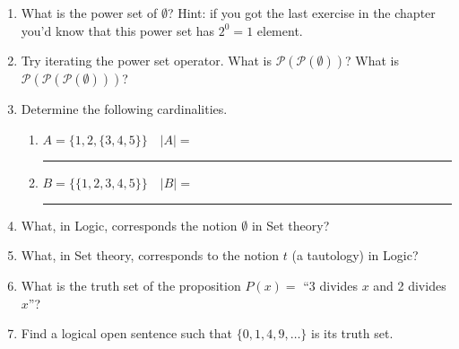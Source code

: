 \begin{enumerate}
\item What is the power set of $\emptyset$?  Hint: if you got the last exercise
in the chapter you'd know that this power set has $2^0 = 1$ element.


\wbvfill

\item Try iterating the power set operator.  What is ${\mathcal P}({\mathcal P}(\emptyset))$?  What is ${\mathcal P}({\mathcal P}({\mathcal P}(\emptyset)))$?


\wbvfill

\workbookpagebreak

\item Determine the following cardinalities.
  \begin{enumerate}
    \item $A = \{ 1, 2, \{3, 4, 5\}\} \quad |A| = $\rule{36pt}{1pt}
    \item $B = \{ \{1, 2, 3, 4, 5\} \} \quad |B| = $\rule{36pt}{1pt}  
  \end{enumerate}


\wbvfill

\item What, in Logic, corresponds the notion $\emptyset$ in Set theory?

\wbvfill

\item What, in Set theory, corresponds to the notion $t$ (a tautology) in Logic?

\wbvfill

\item What is the truth set of the proposition $P(x) = $ ``3 divides $x$ and 2 divides $x$''?

\wbvfill

\workbookpagebreak

\item Find a logical open sentence such that $\{0, 1, 4, 9, \ldots \}$ is
its truth set.


\end{enumerate}

